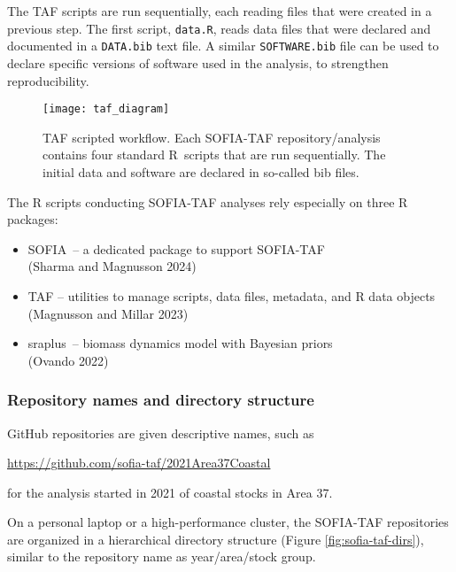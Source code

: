 \documentclass[12pt]{article}
\newcommand\blue[1]{\textcolor{darkblue}{#1}}
\newcommand\SOFIA{{\sf SOFIA}}
\newcommand\sraplus{{\sf sraplus}}
\begin{document}
The TAF scripts are run sequentially, each reading files that were created in a
previous step. The first script, \verb|data.R|, reads data files that were
declared and documented in a \verb|DATA.bib| text file. A similar
\verb|SOFTWARE.bib| file can be used to declare specific versions of software
used in the analysis, to strengthen reproducibility.

\begin{figure}[htb]
  \begin{center}
    \texttt{[image: taf\_diagram]}
    \vspace{2ex}
    \caption{TAF scripted workflow. Each SOFIA-TAF repository/analysis contains
      four standard R~scripts that are run sequentially. The initial data and
      software are declared in so-called bib files.}
    \label{fig:taf-diagram}
  \end{center}
\end{figure}

\newpage

The R scripts conducting SOFIA-TAF analyses rely especially on three R
packages:\\[-2ex]

\begin{itemize}
  \item \SOFIA\ -- a dedicated package to support SOFIA-TAF\\
  (Sharma and Magnusson 2024)
  \item {\sf TAF} -- utilities to manage scripts, data files, metadata, and R
  data objects\\
  (Magnusson and Millar 2023)
  \item \sraplus\ -- biomass dynamics model with Bayesian priors\\
  (Ovando 2022)
\end{itemize}

\subsubsection{Repository names and directory structure}

GitHub repositories are given descriptive names, such as

\qquad\blue{\url{https://github.com/sofia-taf/2021Area37Coastal}}

for the analysis started in 2021 of coastal stocks in Area 37.

On a personal laptop or a high-performance cluster, the SOFIA-TAF repositories
are organized in a hierarchical directory structure (Figure
\ref{fig:sofia-taf-dirs}), similar to the repository name as year/area/stock
group.\\
\end{document}
